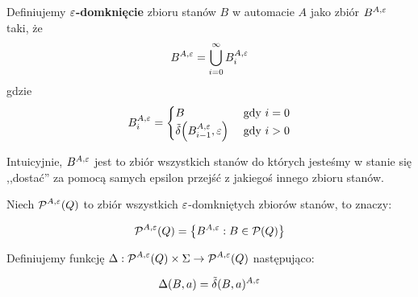 \begin{definition}
	Definiujemy \(\mathbf{\varepsilon}\)\textbf{-domknięcie} zbioru stanów \( B \) w automacie \(A\) jako zbiór \( B^{A, \varepsilon} \) taki, że
	\[
		B^{A, \varepsilon} = \bigcup_{i=0}^\infty B_i^{A, \varepsilon}
	\]
	gdzie
	\[
		B_i^{A, \eps} = \begin{cases}
			B                                           & \text{ gdy } i = 0 \\
			\tilde \delta\pars{B_{i-1}^{A, \eps}, \eps} & \text{ gdy } i > 0
		\end{cases}
	\]
\end{definition}

Intuicyjnie, \( B^{A, \varepsilon} \) jest to zbiór wszystkich stanów do których jesteśmy w stanie się ,,dostać'' za pomocą samych epsilon przejść z jakiegoś innego zbioru stanów.

\begin{definition}
	Niech \(\operatorname{\mathcal{P}}^{A, \varepsilon}(Q) \) to zbiór wszystkich \(\varepsilon\)-domkniętych zbiorów stanów, to znaczy:

	\[
		\powerset^{A, \eps}(Q) = \set{B^{A, \eps} : B \in \powerset(Q)}
	\]
\end{definition}

\begin{definition}
	Definiujemy funkcję \( \Delta : \operatorname{\mathcal{P}}^{A, \varepsilon}(Q) \times \Sigma \rightarrow  \operatorname{\mathcal{P}}^{A, \varepsilon}(Q) \) następująco:

	\begin{equation*}
		\Delta(B,a) = \tilde \delta (B,a)^{A, \varepsilon}
	\end{equation*}
\end{definition}
